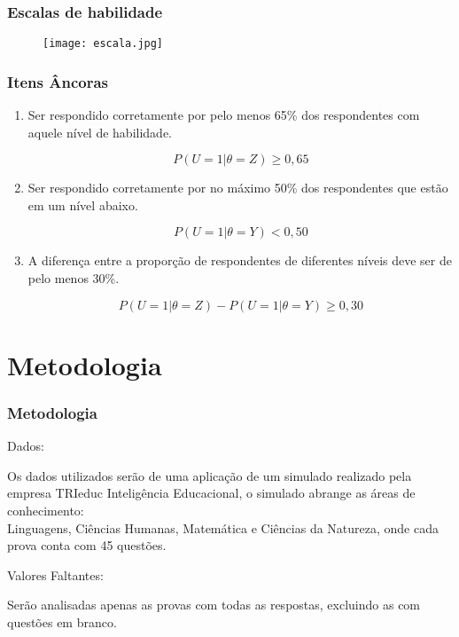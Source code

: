 \documentclass{beamer}
\begin{document}
	\begin{frame}
		
		\frametitle{Escalas de habilidade}
		
		\begin{figure}
			\texttt{[image: escala.jpg]}
		\end{figure}	
	
	\end{frame}
	

	\begin{frame}
		\frametitle{Itens Âncoras}
		\begin{enumerate}
			\item Ser respondido corretamente por pelo menos 65\% dos respondentes com aquele nível de habilidade.
			
			\[
			P(U = 1| \theta = Z ) \geq 0,65
			\]
			
			\item Ser respondido corretamente por no máximo 50\% dos respondentes que estão em um nível abaixo.
			
			\[
			P(U = 1| \theta = Y ) < 0,50
			\]
			
			\item A diferença entre a proporção de respondentes de diferentes níveis deve ser de pelo menos 30\%.
			
			\[
			P(U = 1| \theta = Z ) - P(U = 1| \theta = Y ) \geq  0,30
			\]
			
			
		\end{enumerate}
	\end{frame}
	\section{Metodologia}
	
	\begin{frame}
		
		\frametitle{Metodologia}
		
		\begin{center}	Dados:	\end{center}
		
		Os dados utilizados serão de uma aplicação de um simulado realizado pela empresa TRIeduc	Inteligência Educacional, o simulado abrange as áreas de conhecimento:\\ 
		Linguagens, Ciências Humanas,
		Matemática e Ciências da Natureza, onde cada prova conta com 45 questões. \pause
		
		\begin{center}	Valores Faltantes:	\end{center}
		
		Serão analisadas apenas as provas com todas as respostas, excluindo as com questões em branco.

	\end{frame}
	
\end{document}
